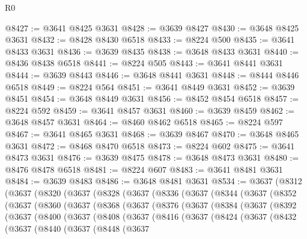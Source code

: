 \begin{lexlean}{R0}
\begin{coremodule}
@8427 := @3641 @8425 @3631
@8428 := @3639 @8427
@8430 := @3648 @8425 @3631
@8432 := @8428 @8430 @6518
@8433 := @8224 @500
@8435 := @3641 @8433 @3631
@8436 := @3639 @8435
@8438 := @3648 @8433 @3631
@8440 := @8436 @8438 @6518
@8441 := @8224 @505
@8443 := @3641 @8441 @3631
@8444 := @3639 @8443
@8446 := @3648 @8441 @3631
@8448 := @8444 @8446 @6518
@8449 := @8224 @564
@8451 := @3641 @8449 @3631
@8452 := @3639 @8451
@8454 := @3648 @8449 @3631
@8456 := @8452 @8454 @6518
@8457 := @8224 @592
@8459 := @3641 @8457 @3631
@8460 := @3639 @8459
@8462 := @3648 @8457 @3631
@8464 := @8460 @8462 @6518
@8465 := @8224 @597
@8467 := @3641 @8465 @3631
@8468 := @3639 @8467
@8470 := @3648 @8465 @3631
@8472 := @8468 @8470 @6518
@8473 := @8224 @602
@8475 := @3641 @8473 @3631
@8476 := @3639 @8475
@8478 := @3648 @8473 @3631
@8480 := @8476 @8478 @6518
@8481 := @8224 @607
@8483 := @3641 @8481 @3631
@8484 := @3639 @8483
@8486 := @3648 @8481 @3631
@8534 := @3637
    (@8312
      (@3637
        (@8320
          (@3637
            (@8328
              (@3637
                (@8336
                  (@3637
                    (@8344
                      (@3637
                        (@8352
                          (@3637
                            (@8360
                              (@3637
                                (@8368
                                  (@3637
                                    (@8376
                                      (@3637
                                        (@8384
                                          (@3637
                                            (@8392
                                              (@3637
                                                (@8400
                                                  (@3637
                                                    (@8408
                                                      (@3637
                                                        (@8416
                                                          (@3637
                                                            (@8424
                                                              (@3637
                                                                (@8432
                                                                  (@3637
                                                                    (@8440
                                                                      (@3637
                                                                        (@8448
                                                                          (@3637

\end{coremodule}
\end{lexlean}
